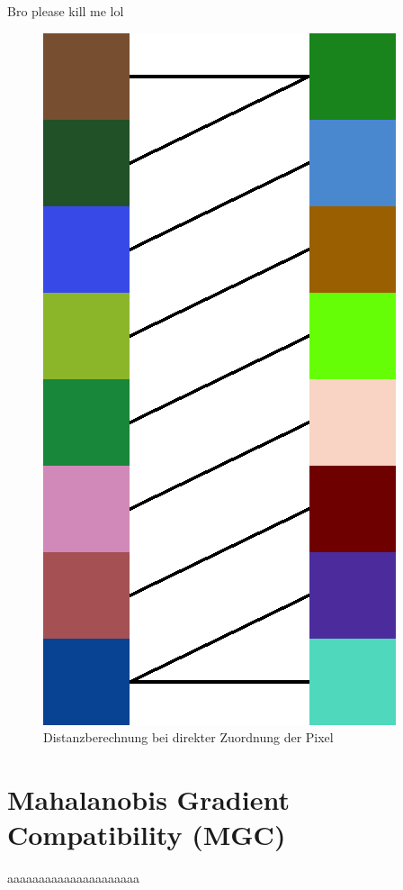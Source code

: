 \documentclass{whswinvcbook}
\begin{document}
Bro please kill me lol
\begin{figure}[H]
    \centering
    \includegraphics[width=0.30\linewidth]{img/dtw_ex2.png}
    \caption{Distanzberechnung bei direkter Zuordnung der Pixel}
    \label{fig-dtw-ex2}
\end{figure}
\section{Mahalanobis Gradient Compatibility (MGC)}
aaaaaaaaaaaaaaaaaaaaa

\backmatter

\preparebibliography

\end{document}
